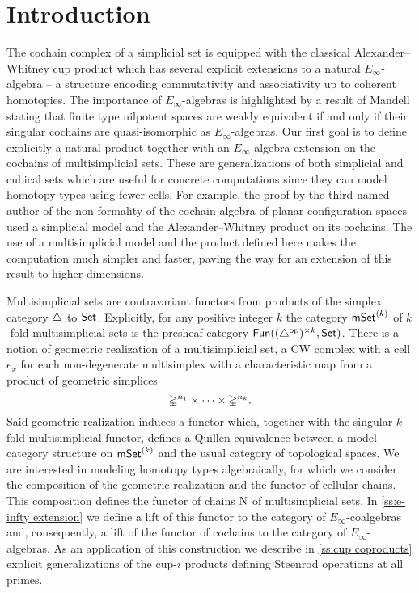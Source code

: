 
\section{Introduction} \label{s:introduction}

The cochain complex of a simplicial set is equipped with the classical Alexander--Whitney cup product which has several explicit extensions to a natural $E_\infty$-algebra \cite{mcclure2003multivariable, berger2004combinatorial, medina2020prop1} -- a structure encoding commutativity and associativity up to coherent homotopies.
The importance of $E_\infty$-algebras is highlighted by a result of Mandell \cite{mandell2006homotopy_type} stating that finite type nilpotent spaces are weakly equivalent if and only if their singular cochains are quasi-isomorphic as $E_\infty$-algebras.
Our first goal is to define explicitly a natural product together with an $E_\infty$-algebra extension on the cochains of multisimplicial sets.
These are generalizations of both simplicial and cubical sets which are useful for concrete computations since they can model homotopy types using fewer cells.
For example, the proof by the third named author of the non-formality of the cochain algebra of planar configuration spaces \cite{formality} used a simplicial model and the Alexander--Whitney product on its cochains.
The use of a multisimplicial model and the product defined here makes the computation much simpler and faster, paving the way for an extension of this result to higher dimensions.

Multisimplicial sets are contravariant functors from products of the simplex category $\triangle$ to $\mathsf{Set}$.
Explicitly, for any positive integer $k$ the category $\mathsf{mSet}^{(k)}$ of $k$-fold multisimplicial sets is the presheaf category $\mathsf{Fun}((\triangle^{\mathrm{op}})^{\times k}, \mathsf{Set})$.
There is a notion of geometric realization of a multisimplicial set, a CW complex with a cell $e_x$ for each non-degenerate multisimplex with a characteristic map from a product of geometric simplices
\[
\mathbb{\Delta}^{n_1}\times\dots\times\mathbb{\Delta}^{n_k}.
\]
Said geometric realization induces a functor which, together with the singular $k$-fold multisimplicial functor, defines a Quillen equivalence between a model category structure on $\mathsf{mSet}^{(k)}$ and the usual category of topological spaces.
We are interested in modeling homotopy types algebraically, for which we consider the composition of the geometric realization and the functor of cellular chains.
This composition defines the functor of chains $\operatorname{N}$ of multisimplicial sets.
In \cref{ss:e-infty extension} we define a lift of this functor to the category of $E_\infty$-coalgebras and, consequently, a lift of the functor of cochains to the category of $E_\infty$-algebras.
As an application of this construction we describe in \cref{ss:cup coproducts} explicit generalizations of the cup-$i$ products defining Steenrod operations at all primes.

